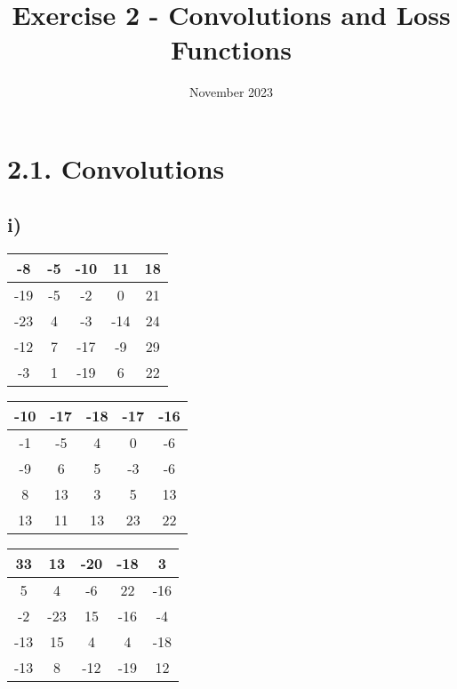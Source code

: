 

\title{Exercise 2 - Convolutions and Loss Functions}
\date{November 2023}



\maketitle
\section*{2.1. Convolutions}

\subsection*{i)}
\begin{table}[h]
  \centering
  \begin{tabular}{|c|c|c|c|c|}
    \hline
    -8 & -5 & -10 & 11 & 18 \\
    \hline
    -19 & -5 & -2 & 0 & 21 \\
    \hline
    -23 & 4 & -3 & -14 & 24 \\
    \hline
    -12 & 7 & -17 & -9 & 29 \\
    \hline
    -3 & 1 & -19 & 6 & 22 \\
    \hline
  \end{tabular}
\end{table}

\hspace{\fill}

\begin{table}[h]
  \centering
  \begin{tabular}{|c|c|c|c|c|}
    \hline
    -10 & -17 & -18 & -17 & -16 \\
    \hline
    -1 & -5 & 4 & 0 & -6 \\
    \hline
    -9 & 6 & 5 & -3 & -6 \\
    \hline
    8 & 13 & 3 & 5 & 13 \\
    \hline
    13 & 11 & 13 & 23 & 22 \\
    \hline
  \end{tabular}
\end{table}

\hspace{\fill}

\begin{table}[h]
  \centering
  \begin{tabular}{|c|c|c|c|c|}
    \hline
    33 & 13 & -20 & -18 & 3 \\
    \hline
    5 & 4 & -6 & 22 & -16 \\
    \hline
    -2 & -23 & 15 & -16 & -4 \\
    \hline
    -13 & 15 & 4 & 4 & -18 \\
    \hline
    -13 & 8 & -12 & -19 & 12 \\
    \hline
  \end{tabular}
\end{table}

